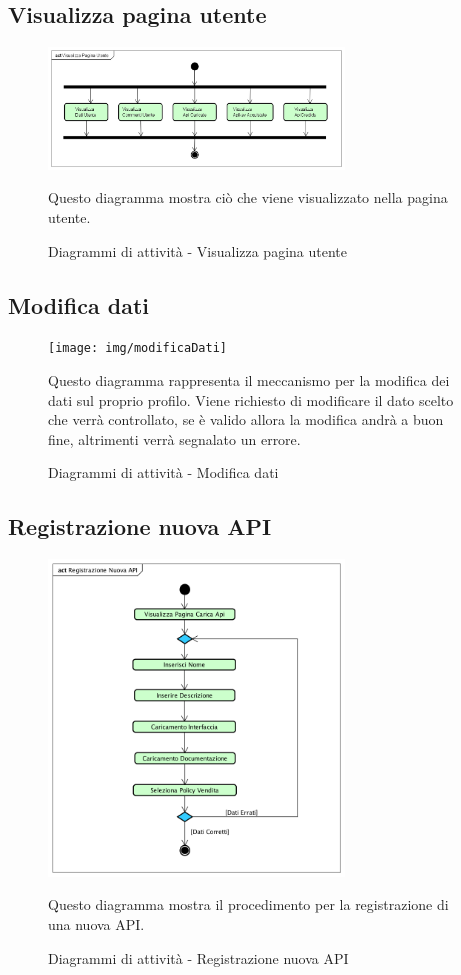 {	\subsection{Visualizza pagina utente}{
		\begin{figure}[ht]
			\centering
			\includegraphics[width=0.7\textwidth]{img/visualizzaPaginaUtente}
			\caption{Diagrammi di attività - Visualizza pagina utente}
			Questo diagramma mostra ciò che viene visualizzato nella pagina utente.  
		\end{figure}	
	}	
	\subsection{Modifica dati}{
		\begin{figure}[ht]
			\centering
			\texttt{[image: img/modificaDati]}
			\caption{Diagrammi di attività - Modifica dati}
			Questo diagramma rappresenta il meccanismo per la modifica dei dati sul proprio profilo. Viene richiesto di modificare il dato scelto che verrà controllato, se è valido allora la modifica andrà a buon fine, altrimenti verrà segnalato un errore. 
		\end{figure}	
	}
	\subsection{Registrazione nuova API}{
		\begin{figure}[ht]
			\centering
			\includegraphics[width=0.7\textwidth]{img/registrazioneNuovaApi}
			\caption{Diagrammi di attività - Registrazione nuova API}
			Questo diagramma mostra il procedimento per la registrazione di una nuova API. 
		\end{figure}
	}
}
